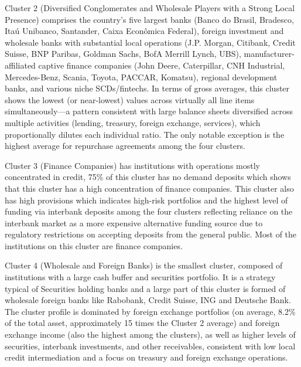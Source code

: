Cluster 2 (Diversified Conglomerates and Wholesale Players with a Strong Local Presence) comprises the country's five largest banks (Banco do Brasil, Bradesco, Itaú Unibanco, Santander, Caixa Econômica Federal), foreign investment and wholesale banks with substantial local operations (J.P. Morgan, Citibank, Credit Suisse, BNP Paribas, Goldman Sachs, BofA Merrill Lynch, UBS), manufacturer-affiliated captive finance companies (John Deere, Caterpillar, CNH Industrial, Mercedes-Benz, Scania, Toyota, PACCAR, Komatsu), regional development banks, and various niche SCDs/fintechs. In terms of gross averages, this cluster shows the lowest (or near-lowest) values across virtually all line items simultaneously—a pattern consistent with large balance sheets diversified across multiple activities (lending, treasury, foreign exchange, services), which proportionally dilutes each individual ratio. The only notable exception is the highest average for repurchase agreements among the four clusters.

Cluster 3 (Finance Companies) has institutions with operations mostly concentrated in credit, 75\% of this cluster has no demand deposits which shows that this cluster has a high concentration of finance companies. This cluster also has high provisions which indicates high-risk portfolios and the highest level of funding via interbank deposits among the four clusters reflecting reliance on the interbank market as a more expensive alternative funding source due to regulatory restrictions on accepting deposits from the general public. Most of the institutions on this cluster are finance companies.

Cluster 4 (Wholesale and Foreign Banks) is the smallest cluster, composed of institutions with a large cash buffer and securities portfolio. It is a strategy typical of Securities holding banks and a large part of this cluster is formed of wholesale foreign banks like Rabobank, Credit Suisse, ING and Deutsche Bank. The cluster profile is dominated by foreign exchange portfolios (on average, 8.2\% of the total asset, approximately 15 times the Cluster 2 average) and foreign exchange income (also the highest among the clusters), as well as higher levels of securities, interbank investments, and other receivables, consistent with low local credit intermediation and a focus on treasury and foreign exchange operations. %


